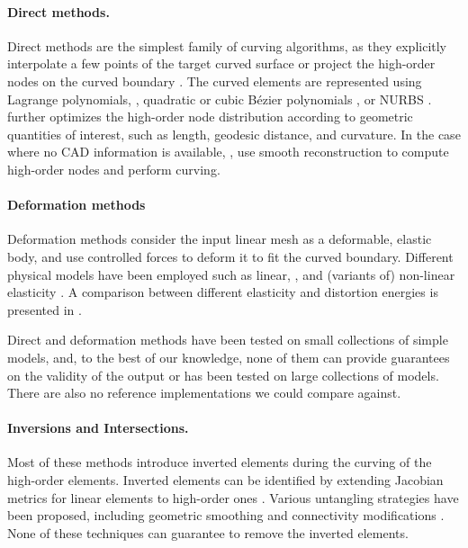 \paragraph{Direct methods.} Direct methods are the simplest family of curving algorithms, as they explicitly interpolate a few points of the target curved surface or project the high-order nodes on the curved boundary  \cite{dey1999curvilinear,Ghasemi2016,MOXEY2015636,abgrall2012,sherwin2002mesh,turner2017high,marcon2019semi}. The curved elements are represented using Lagrange polynomials, \cite{dey1999curvilinear,Peir2008}, quadratic or cubic B{\'e}zier polynomials \cite{George2012,Qiukai2013,Luo2002pVersionMG}, or NURBS \cite{ENGVALL2016378,ENGVALL201783}. \cite{SHEPHARD2005251,sherwin2002mesh} further optimizes the high-order node distribution according to geometric quantities of interest, such as length, geodesic distance, and curvature. 
In the case where no CAD information is available, \cite{wang2016construction}, \cite{jiao2012reconstructing} use smooth reconstruction to compute high-order nodes and perform curving.

\paragraph{Deformation methods} Deformation methods consider the input linear mesh as a deformable, elastic body, and use controlled forces to deform it to fit the curved boundary. Different physical models have been employed such as linear, \cite{Abgrall2014,abgrall2012,dobrzynski2017,Xie2013}, and (variants of) non-linear elasticity \cite{Persson2009,MOXEY2016130,FORTUNATO20161}. A comparison between different elasticity and distortion energies is presented in \cite{Poya2016, TURNER2016340, dobrev2019target}.

Direct and deformation methods have been tested on small collections of simple models, and, to the best of our knowledge, none of them can provide guarantees on the validity of the output or has been tested on large collections of models. There are also no  reference implementations we could compare against. 

\paragraph{Inversions and Intersections.} Most of these methods introduce inverted elements during the curving of the high-order elements. Inverted elements can be identified by extending Jacobian metrics for linear elements \cite{Knupp20002,Knupp2000} to high-order ones \cite{Luke2018,Gargallo2014,johnen2013geometrical,Poya2016,Roca2012}. Various untangling strategies have been proposed, including geometric smoothing and connectivity modifications  \cite{Cardoze2004,dey1999curvilinear,gargallo2013high,George2012,Qiukai2013,Luo2002pVersionMG,Peir2008,SHEPHARD2005251,dobrzynski2017,Gargallo2015,Geuzaine2015,Roca2012,RUIZGIRONES2017362,RUIZGIRONES201652,RUIZGIRONES2016315,STEES2017180,Steve2016,TOULORGE20138,TOULORGE2016361,ZIEL201791,dobrev2019target, turner2017high, luo2008tracking,lu2014parallel}.  None of these techniques can guarantee to remove the inverted elements.

